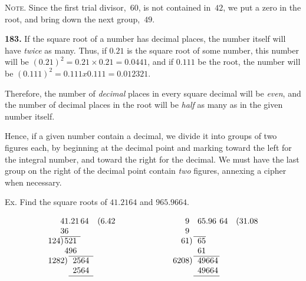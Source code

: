 \documentclass[12pt]{book}[2005/09/16]
\newcommand{\Paragraph}[1]{\medskip\par\textbf{#1}}
\newenvironment{Remark}[1][]{\par\small\textsc{#1}}{\par}
\newenvironment{Soln}[1][]{\par\small\textsc{#1}}{\par}
\begin{document}
\begin{Remark}[Note.] Since the first trial divisor,~$60$, is not contained in~$42$, we
put a zero in the root, and bring down the next group,~$49$.
\end{Remark}

\Paragraph{183.}  If the square root of a number has decimal places,
the number itself will have \emph{twice} as many.  Thus, if $0.21$
is the square root of some number, this number will be
$(0.21)^{2} = 0.21 × 0.21 = 0.0441$, and if $0.111$ be the root,
the number will be $(0.111)^{2} = 0.111 x 0.111 = 0.012321$.

Therefore, the number of \emph{decimal} places in every square
decimal will be \emph{even}, and the number of decimal places in
the root will be \emph{half} as many as in the given number itself.

Hence, if a given number contain a decimal, we divide
it into groups of two figures each, by beginning at the
decimal point and marking toward the left for the integral
number, and toward the right for the decimal.  We must
have the last group on the right of the decimal point contain
\emph{two} figures, annexing a cipher when necessary.

Ex.  Find the square roots of $41.2164$ and $965.9664$.
\begin{Soln}
\[
\begin{array}{r@{}r@{}l@{\,}ll}
            & 41&.21&64& (6.42 \\
            & 36 \\
\cline{2-3}
124\rlap{)} &  5&21 \\
            &  4&96 \\
\cline{3-4}
\multicolumn{2}{r}{1282\rlap{)}}&\multicolumn{2}{l}{2564} \\
            &   &\multicolumn{2}{l}{2564} \\
\cline{3-4}
\end{array}\qquad\qquad\qquad
\begin{array}{rl@{}l@{\,}ll}
    9&65&.96& 64&(31.08 \\
    9 \\
\cline{2-2}
  61\rlap{)}&65 \\
     &61 \\
\cline{2-3}
6208\rlap{)}&49&664 \\
     &49&664 \\
\cline{2-3}
\end{array}
\]
\end{Soln}
\end{document}

